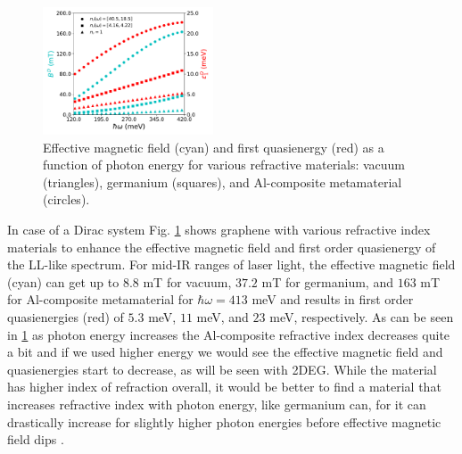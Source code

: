 \begin{figure}
  \includegraphics[width=0.45\textwidth]{./figures/dirac-eff-bfield-energy.pdf}
  \caption{Effective magnetic field (cyan) and first quasienergy (red) as a function of photon energy for various refractive materials: vacuum (triangles), germanium (squares), and  Al-composite metamaterial (circles).}
  \label{fig:dirac-bfield-energy}
\end{figure}

In case of a Dirac system Fig. \ref{fig:dirac-bfield-energy} shows graphene with various refractive index materials to enhance the effective magnetic field and first order quasienergy of the LL-like spectrum.
For mid-IR ranges of laser light, the effective magnetic field (cyan) can get up to $8.8$ mT for vacuum, $37.2$ mT for germanium, and $163$ mT for Al-composite metamaterial for $\hbar\omega=413$ meV and results in first order quasienergies (red) of $5.3$ meV, $11$ meV, and $23$ meV, respectively.
As can be seen in \ref{fig:dirac-bfield-energy} as photon energy increases the Al-composite refractive index decreases quite a bit and if we used higher energy we would see the effective magnetic field and quasienergies start to decrease, as will be seen with 2DEG.
While the material has higher index of refraction overall, it would be better to find a material that increases refractive index with photon energy, like germanium can, for it can drastically increase for slightly higher photon energies before effective magnetic field dips \cite{amotchkinaCharacterizationEbeamEvaporated2020}.

